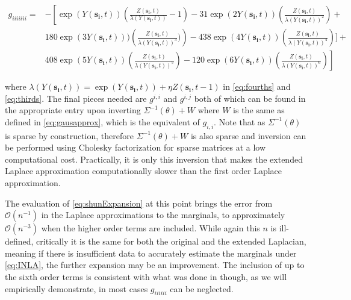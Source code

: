 \documentclass[11pt]{isuthesis}
\begin{document}
	\begin{align}
	g_{iiiiiii}=  &-\left[\exp(Y(\boldsymbol{s_i},t))\left(\frac{Z(\boldsymbol{s_i},t)}{\lambda(Y(\boldsymbol{s_i},t))}-1\right)-31\exp(2 Y(\boldsymbol{s_i},t))\left(\frac{Z(\boldsymbol{s_i},t)}{\lambda(Y(\boldsymbol{s_i},t))^2}\right)+\right. \nonumber \\
	& 180\exp(3Y(\boldsymbol{s_i},t)))\left(\frac{ Z(\boldsymbol{s_i},t)}{\lambda(Y(\boldsymbol{s_i},t))^3})\right)-438\exp(4Y(\boldsymbol{s_i},t))\left(\frac{ Z(\boldsymbol{s_i},t)}{\lambda(Y(\boldsymbol{s_i},t))^4}\right)]+\nonumber\\
	& \left. 408\exp(5Y(\boldsymbol{s_i},t))\left(\frac{ Z(\boldsymbol{s_i},t)}{\lambda(Y(\boldsymbol{s_i},t))^5}\right)-120\exp(6Y(\boldsymbol{s_i},t))\left(\frac{ Z(\boldsymbol{s_i},t)}{\lambda(Y(\boldsymbol{s_i},t))^6}\right)\right] \label{eq:sixths}
	\end{align}
	
	where $\lambda(Y(\boldsymbol{s_i},t))=\exp(Y(\boldsymbol{s_i},t))+\eta Z(\boldsymbol{s_i},t-1)$ in \eqref{eq:fourths} and \eqref{eq:thirds}.  The final pieces needed are $g^{i,i}$ and $g^{i,j}$ both of which can be found in the appropriate entry upon inverting $\Sigma^{-1}(\theta)+W$ where $W$ is the same as defined in \eqref{eq:gausapprox}, which is the equivalent of $g_{i,i}$.  Note that as $\Sigma^{-1}(\theta)$ is sparse by construction, therefore $\Sigma^{-1}(\theta)+W$ is also sparse and inversion can be performed using Cholesky factorization for sparse matrices at a low computational cost. Practically, it is only this inversion that makes the extended Laplace approximation computationally slower than the first order Laplace approximation.
	
	The evaluation of \eqref{eq:shunExpansion} at this point brings the error from $\mathcal{O}(n^{-1})$ in the Laplace approximations to the marginals, to approximately $\mathcal{O}(n^{-3})$ when the higher order terms are included. While again this $n$ is ill-defined, critically it is the same for both the original and the extended Laplacian, meaning if there is insufficient data to accurately estimate the marginals under \eqref{eq:INLA}, the further expansion may be an improvement.  The inclusion of up to the sixth order terms is consistent with what was done in \cite{raudenbush2000maximum} though, as we will empirically demonstrate, in most cases $g_{iiiiii}$ can be neglected.
	
\end{document}
